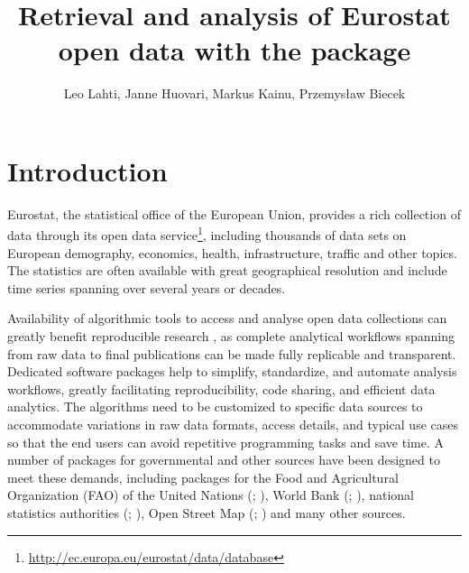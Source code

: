 \title{Retrieval and analysis of Eurostat open data with the  package}
\author{Leo Lahti, Janne Huovari, Markus Kainu, Przemys{\l}aw Biecek}

\maketitle



\section{Introduction}

Eurostat, the statistical office of the European Union, provides a
rich collection of data through its open data
service\footnote{\url{http://ec.europa.eu/eurostat/data/database}},
including thousands of data sets on European demography, economics,
health, infrastructure, traffic and other topics. The statistics are
often available with great geographical resolution and include time
series spanning over several years or decades.

Availability of algorithmic tools to access and analyse open data
collections can greatly benefit reproducible
research \citep{Gandrud13, Boettiger2015}, as complete analytical
workflows spanning from raw data to final publications can be made
fully replicable and transparent. Dedicated software packages help to
simplify, standardize, and automate analysis workflows, greatly
facilitating reproducibility, code sharing, and efficient data
analytics. The algorithms need to be customized to specific data
sources to accommodate variations in raw data formats, access details,
and typical use cases so that the end users can avoid repetitive
programming tasks and save time. A number of packages for governmental
and other sources have been designed to meet these demands, including
packages for the Food and Agricultural Organization (FAO) of the
United Nations (; \cite{FAOSTAT}), World Bank
(; \cite{WDI}), national statistics authorities
(; \cite{pxweb}), Open Street Map
(; \cite{osmar}) and many other sources.

